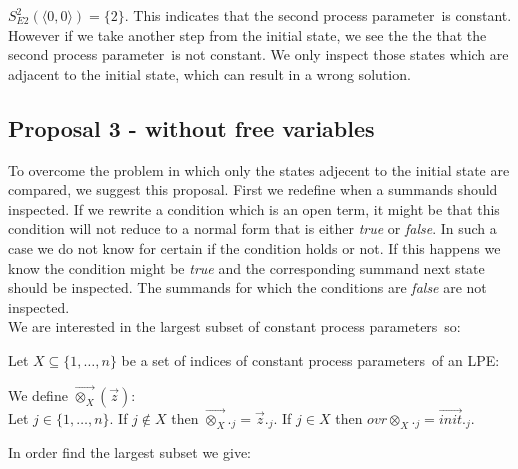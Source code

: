 \index{}\documentclass[a4paper,10pt]{article}
\theoremstyle{plain}
\theoremstyle{definition}
\newcommand{\ovr}{\overrightarrow}
\newcommand{\pp}{process parameter}
\newcommand{\pps}{process parameters}
\newcommand{\ti}{\textit}
\begin{document}
\begin{defn}
$S_{E2}^2(\langle 0,0 \rangle) = \lbrace 2 \rbrace$. This indicates that the second \pp\ is constant. However if we take another step from the initial state, we see the the that the second \pp\ is not constant. We only inspect those states which are adjacent to the initial state, which can result in a wrong solution.
\end{defn}

\subsection{Proposal 3 - without free variables}
To overcome the problem in which only the states adjecent to the initial state are compared, we suggest this proposal. First we redefine when a summands should inspected. If we rewrite a condition which is an open term, it might be that this condition will not reduce to a normal form that is either \ti{true} or \ti{false}. In such a case we do not know for certain if the condition holds or not. If this happens we know the condition might be \ti{true} and the corresponding summand next state should be inspected. The summands for which the conditions are \ti{false} are not inspected. \\

We are interested in the largest subset of constant \pps\ so:

Let $X \subseteq \lbrace 1, \ldots, n \rbrace$ be a set of indices of constant \pps\ of an LPE:

\begin{defn} We define $\ovr{\otimes_X}(\ovr{z})$:\\
Let $j \in \lbrace 1, \dots, n \rbrace $. 
If $j \not\in X$ then $\ovr{\otimes_X}._j = \ovr{z}._j$. 
If $j \in X$ then $ovr{\otimes_X}._j = \ovr{init}._j$.
\end{defn}

In order find the largest subset we give: %
\end{document}
